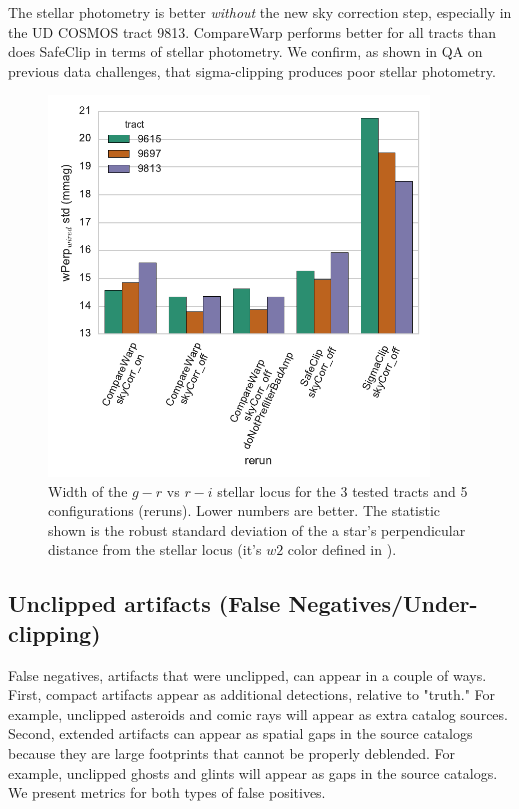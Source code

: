 \documentclass[DM,authoryear,toc]{lsstdoc}
\begin{document}
The stellar photometry is better \emph{without} the new sky correction step, especially in the UD COSMOS tract 9813.
CompareWarp performs better for all tracts than does SafeClip in terms of stellar photometry.
We confirm, as shown in QA on previous data challenges, that sigma-clipping produces poor stellar photometry.

\begin{figure}
\begin{centering}
\includegraphics[width=0.9\textwidth]{figures/w_std_fit.pdf}
\par\end{centering}
\caption{\label{fig:w_std_fit} Width of the $g-r$ vs $r-i$ stellar locus for the 3 tested tracts and 5 configurations (reruns). Lower numbers are better. The statistic shown is the robust standard deviation of the a star's perpendicular distance from the stellar locus (it's $w2$ color defined in \cite{Ivezic2004b}). }
\end{figure}

\subsection{Unclipped artifacts (False Negatives/Under-clipping)}

False negatives, artifacts that were unclipped, can appear in a couple of ways.
First, compact artifacts appear as additional detections, relative to "truth."
For example, unclipped asteroids and comic rays will appear as extra catalog sources.
Second, extended artifacts can appear as spatial gaps in the source catalogs because they are large footprints that cannot be properly deblended.
For example, unclipped ghosts and glints will appear as gaps in the source catalogs.
We present metrics for both types of false positives.
\end{document}
